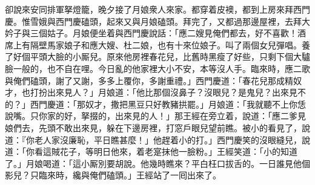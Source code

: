 卻說來安同排軍拏燈籠，晚夕接了月娘衆人來家。都穿着皮襖，都到上房來拜西門慶。惟雪娥與西門慶磕頭，起來又與月娘磕頭。拜完了，又都過那邊屋裡，去拜大妗子與三個姑子。月娘便坐着與西門慶說話：「應二嫂見俺們都去，好不喜歡！酒席上有隔壁馬家娘子和應大嫂、杜二娘，也有十來位娘子。叫了兩個女兒彈唱。養了好個平頭大臉的小厮兒。原來他房裡春花兒，比舊時黑瘦了好些，只剩下個大驢臉一般的，也不自在哩。今日亂的他家裡大小不安，本等沒人手。臨來時，應二歌與俺們磕頭，謝了又謝，多多上覆你，多謝重禮。」西門慶道：「春花兒那成精奴才，也打扮出來見人？」{}月娘道：「他比那個沒鼻子？沒眼兒？是鬼兒？出來見不的？」西門慶道：「那奴才，撒把黑豆只好教豬拱罷。」月娘道：「我就聽不上你恁說嘴。只你家的好，拏掇的，出來見的人！」那王經在旁立着，說道：「應二爹見娘們去，先頭不敢出來見，躲在下邊房裡，打窓戶眼兒望前瞧。被小的看見了，說道：『你老人家沒廉恥，平日瞧甚麼！」他趕着小的打。」西門慶笑的沒眼縫兒，{}說道：「你看這賊花子，等明日他來，着老寔抹他一臉粉。」王經笑道：「小的知道了。」月娘喝道：「這小厮別要胡說。他幾時瞧來？平白枉口拔舌的。一日誰見他個影兒？只臨來時，纔與俺們磕頭。」王經站了一囘出來了。

